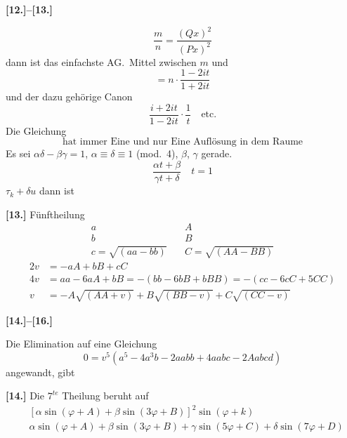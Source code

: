 \documentclass[10pt,a4paper]{article}
\begin{document}
\newpage
\textbf{[12.]--[13.]}

\begin{equation*}
\frac{m}{n} = \frac{(Qx)^2}{(Px)^2}
\end{equation*}
%
dann ist das einfachste AG.\ Mittel zwischen $m$ und
%
\begin{equation*}
= n \cdot \frac{1 - 2it}{1 + 2it}
\end{equation*}
%
und der dazu geh\"orige Canon
%
\begin{equation*}
\frac{i + 2it}{1 - 2it} \cdot \frac{1}{t} \quad \text{etc.}
\end{equation*}
%
Die Gleichung
%
\begin{equation*}
\text{hat immer Eine und nur Eine Aufl\"osung in dem Raume}
\end{equation*}
%
Es sei $\alpha\delta - \beta\gamma = 1$, $\alpha \equiv \delta \equiv 1$ (mod.\ 4), $\beta$, $\gamma$ gerade.
%
\begin{equation*}
\frac{\alpha t + \beta}{\gamma t + \delta} \quad t = 1
\end{equation*}
%
$\tau_k + \delta u$ dann ist

\textbf{[13.]} F\"unftheilung
%
\begin{align*}
a &\quad A \\
b &\quad B \\
c = \sqrt{(aa - bb)} &\quad C = \sqrt{(AA - BB)}
\end{align*}
%
\begin{align*}
2v &= -aA + bB + cC \\
4v &= aa - 6aA + bB = -(bb - 6bB + bBB) = -(cc - 6cC + 5CC) \\
v &= -A\sqrt{(AA + v)} + B\sqrt{(BB - v)} + C\sqrt{(CC - v)}
\end{align*}

\newpage
\textbf{[14.]--[16.]}

Die Elimination auf eine Gleichung
%
\begin{equation*}
0 = v^5(a^5 - 4a^3b - 2aabb + 4aabc - 2Aabcd)
\end{equation*}
%
angewandt, gibt

\textbf{[14.]} Die $7^{te}$ Theilung beruht auf
%
\begin{align*}
&[\alpha\sin(\varphi + A) + \beta\sin(3\varphi + B)]^2 \sin(\varphi + k) \\
&\alpha\sin(\varphi + A) + \beta\sin(3\varphi + B) + \gamma\sin(5\varphi + C) + \delta\sin(7\varphi + D)
\end{align*}
\end{document}
